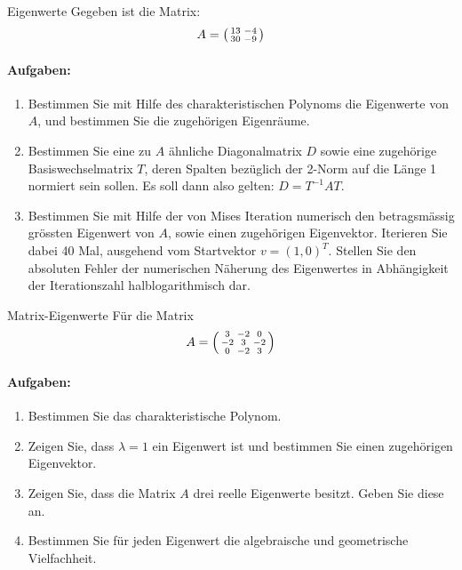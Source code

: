\begin{example2}{Eigenwerte}
Gegeben ist die Matrix:
$$A = \begin{psmallmatrix}
13 & -4\\
30 & -9
\end{psmallmatrix}$$

\paragraph{Aufgaben:}
\begin{enumerate}
    \item Bestimmen Sie mit Hilfe des charakteristischen Polynoms die Eigenwerte von $A$, und bestimmen Sie die zugehörigen Eigenräume.
    
    \item Bestimmen Sie eine zu $A$ ähnliche Diagonalmatrix $D$ sowie eine zugehörige Basiswechselmatrix $T$, deren Spalten bezüglich der 2-Norm auf die Länge 1 normiert sein sollen. Es soll dann also gelten: $D = T^{-1}AT$.
    
    \item Bestimmen Sie mit Hilfe der von Mises Iteration numerisch den betragsmässig grössten Eigenwert von $A$, sowie einen zugehörigen Eigenvektor. Iterieren Sie dabei 40 Mal, ausgehend vom Startvektor $v = (1,0)^T$. Stellen Sie den absoluten Fehler der numerischen Näherung des Eigenwertes in Abhängigkeit der Iterationszahl halblogarithmisch dar.
\end{enumerate}
\end{example2}


\begin{example2}{Matrix-Eigenwerte}
Für die Matrix
$$A = \begin{psmallmatrix}
3 & -2 & 0\\
-2 & 3 & -2\\
0 & -2 & 3
\end{psmallmatrix}$$

\paragraph{Aufgaben:}
\begin{enumerate}
    \item Bestimmen Sie das charakteristische Polynom.
    
    \item Zeigen Sie, dass $\lambda = 1$ ein Eigenwert ist und bestimmen Sie einen zugehörigen Eigenvektor.
    
    \item Zeigen Sie, dass die Matrix $A$ drei reelle Eigenwerte besitzt. Geben Sie diese an.
    
    \item Bestimmen Sie für jeden Eigenwert die algebraische und geometrische Vielfachheit.
\end{enumerate}
\end{example2}

